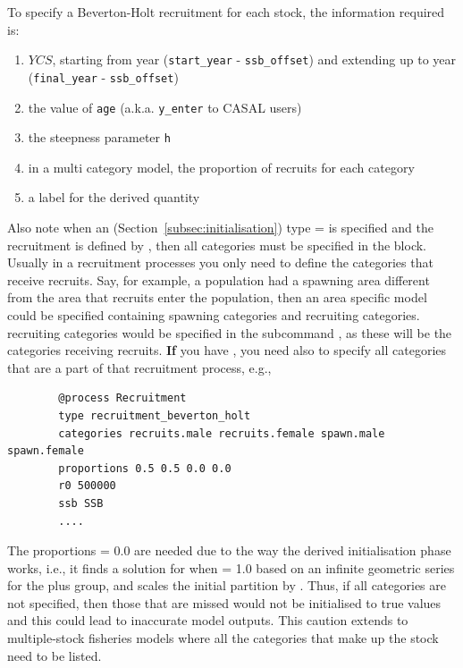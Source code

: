To specify a Beverton-Holt recruitment for each stock, the information required is:

\begin{enumerate}
	\item $YCS$, starting from year (\texttt{start\_year} - \texttt{ssb\_offset}) and extending up to year (\texttt{final\_year} - \texttt{ssb\_offset})
	\item the value of \texttt{age} (a.k.a. \texttt{y\_enter} to CASAL users)
	\item the steepness parameter \texttt{h}
	\item in a multi category model, the proportion of recruits for each category
	\item a label for the derived quantity
\end{enumerate}

Also note when an  (Section~\ref{subsec:initialisation}) type =  is specified and the recruitment is defined by , then all categories must be specified in the  block. Usually in a recruitment processes you only need to define the categories that receive recruits. Say, for example, a population had a spawning area different from the area that recruits enter the population, then an area specific model could be specified containing spawning categories and recruiting categories. recruiting categories would be specified in the subcommand , as these will be the categories receiving recruits. \textbf{If} you have ,  you need also to specify all categories that are a part of that recruitment process, e.g.,

{\small{\begin{verbatim}
		@process Recruitment
		type recruitment_beverton_holt
		categories recruits.male recruits.female spawn.male spawn.female
		proportions 0.5 0.5 0.0 0.0
		r0 500000
		ssb SSB
		....
		\end{verbatim}}}
The proportions = 0.0 are needed due to the way the derived initialisation phase works, i.e., it finds a solution for when  = 1.0 based on an infinite geometric series for the plus group, and scales the initial partition by . Thus, if all categories are not specified, then those that are missed would not be initialised to true values and this could lead to inaccurate model outputs. This caution extends to multiple-stock fisheries models where all the categories that make up the stock need to be listed.
